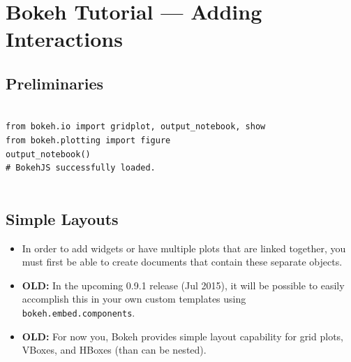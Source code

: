 \documentclass[a4paper,12pt]{article}
\begin{document}
	\large
 	
\section*{Bokeh Tutorial — Adding Interactions}

\subsection*{Preliminaries}
\begin{framed}
\begin{verbatim}

from bokeh.io import gridplot, output_notebook, show
from bokeh.plotting import figure
output_notebook()
# BokehJS successfully loaded.
	
\end{verbatim}
\end{framed}

\newpage
\subsection*{Simple Layouts}
\begin{itemize}
\item In order to add widgets or have multiple plots that are linked together, you must first be able to create documents that contain these separate objects. \item \textbf{OLD:} In the upcoming 0.9.1 release (Jul 2015), it will be possible to easily accomplish this in your own custom templates using \texttt{bokeh.embed.components}. 
\item \textbf{OLD:} For now you, Bokeh provides simple layout capability for grid plots, VBoxes, and HBoxes (than can be nested).
\end{itemize}
\end{document}
